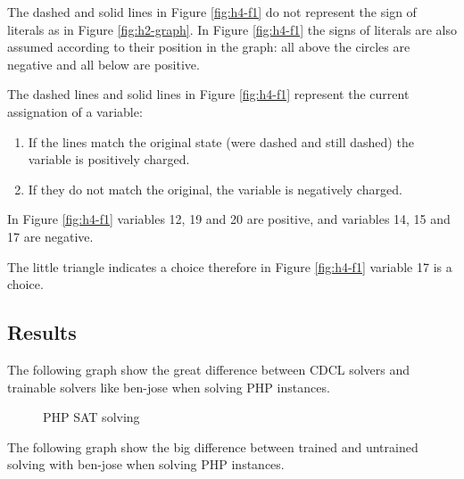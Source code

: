 \documentclass{easychair}
\begin{document}
The dashed and solid lines in Figure \ref{fig:h4-f1} do not represent the sign of literals as in Figure \ref{fig:h2-graph}. In Figure \ref{fig:h4-f1} the signs of literals are also assumed according to their position in the graph: all above the circles are negative and all below are positive. 

The dashed lines and solid lines in Figure \ref{fig:h4-f1} represent the current assignation of a variable: 

\begin{enumerate}
\item
If the lines match the original state (were dashed and still dashed) the variable is positively charged.

\item
If they do not match the original, the variable is negatively charged.
\end{enumerate}

In Figure \ref{fig:h4-f1} variables 12, 19 and 20 are positive, and variables 14, 15 and 17 are negative.

The little triangle indicates a choice therefore in Figure \ref{fig:h4-f1} variable 17 is a choice.

\subsection{Results}
\label{subsect:results}

The following graph show the great difference between CDCL solvers and trainable solvers like ben-jose when solving PHP instances.

\begin{figure}[H]
	\begin{centering}
		\caption{PHP SAT solving}
		\label{fig:results-1}
	\end{centering}
\end{figure}

The following graph show the big difference between trained and untrained solving with ben-jose when solving PHP instances.
\end{document}
